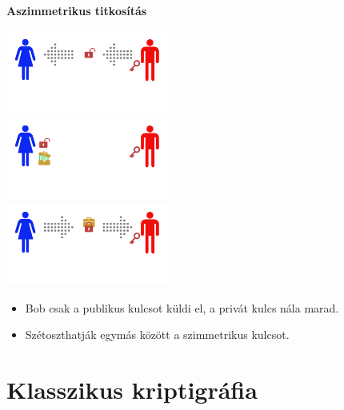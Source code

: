 \documentclass{beamer}
\begin{document}
    \begin{frame}

        \center

        \textbf{Aszimmetrikus titkosítás}

        \hspace{5pt}

        \includegraphics[trim={0 50px 0 15px},clip,width=0.4\textwidth]{public2.png}\\
        \includegraphics[trim={0 50px 0 15px},clip,width=0.4\textwidth]{public3.png}\\
        \includegraphics[trim={0 50px 0 15px},clip,width=0.4\textwidth]{public4.png}

        \begin{itemize}
            \item Bob csak a publikus kulcsot küldi el, a privát kulcs nála marad.
            \item Szétoszthatják egymás között a szimmetrikus kulcsot.
        \end{itemize}

    \end{frame}

    \section{Klasszikus kriptigráfia}
\end{document}

